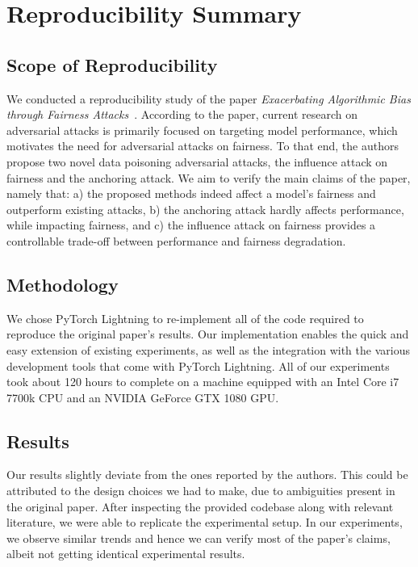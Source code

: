 \section{Reproducibility Summary}

\subsection*{Scope of Reproducibility}
We conducted a reproducibility study of the paper \textit{Exacerbating Algorithmic Bias through Fairness Attacks}~\cite{mehrabi2021exacerbating}. According to the paper, current research on adversarial attacks is primarily focused on targeting model performance, which motivates the need for adversarial attacks on fairness. To that end, the authors propose two novel data poisoning adversarial attacks, the influence attack on fairness and the anchoring attack. We aim to verify the main claims of the paper, namely that: a) the proposed methods indeed affect a model's fairness and outperform existing attacks, b) the anchoring attack hardly affects performance, while impacting fairness, and c) the influence attack on fairness provides a controllable trade-off between performance and fairness degradation.

\subsection*{Methodology}
We chose PyTorch Lightning to re-implement all of the code required to reproduce the original paper's results. Our implementation enables the quick and easy extension of existing experiments, as well as the integration with the various development tools that come with PyTorch Lightning. All of our experiments took about 120 hours to complete on a machine equipped with an Intel Core i7 7700k CPU and an NVIDIA GeForce GTX 1080 GPU.

\subsection*{Results}
Our results slightly deviate from the ones reported by the authors. This could be attributed to the design choices we had to make, due to ambiguities present in the original paper. After inspecting the provided codebase along with relevant literature, we were able to replicate the experimental setup. In our experiments, we observe similar trends and hence we can verify most of the paper's claims, albeit not getting identical experimental results.

